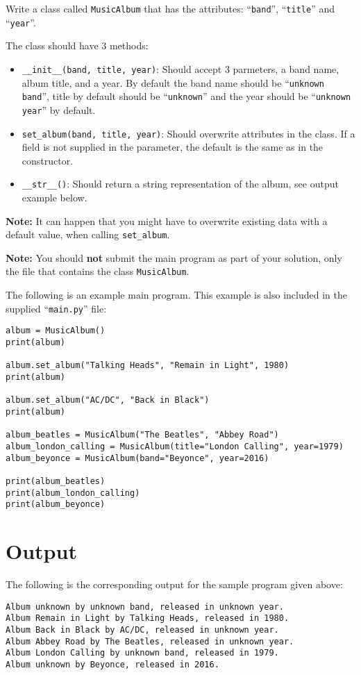
Write a class called \texttt{MusicAlbum} that has the attributes:
``\texttt{band}'', ``\texttt{title}'' and ``\texttt{year}''.

The class should have $3$ methods:
\begin{itemize}
    \item \texttt{\_\_init\_\_(band, title, year)}: 
    Should accept $3$ parmeters, a band name, album title, and a year.
    By default the band name should be ``\texttt{unknown band}'',
    title by default should be ``\texttt{unknown}''
    and the year should be ``\texttt{unknown year}'' by default.

    \item \texttt{set\_album(band, title, year)}:
    Should overwrite attributes in the class.
    If a field is not supplied in the parameter,
    the default is the same as in the constructor.

    \item \texttt{\_\_str\_\_()}:
    Should return a string representation of the album,
    see output example below.
\end{itemize}

\textbf{Note:}
It can happen that you might have to overwrite existing data with a default value,
when calling \texttt{set\_album}.

\textbf{Note:}
You should \textbf{not} submit the main program as part of your solution,
only the file that contains the class \texttt{MusicAlbum}.

The following is an example main program.
This example is also included in the supplied ``\texttt{main.py}'' file:
\begin{verbatim}
album = MusicAlbum()
print(album)

album.set_album("Talking Heads", "Remain in Light", 1980)
print(album)

album.set_album("AC/DC", "Back in Black")
print(album)

album_beatles = MusicAlbum("The Beatles", "Abbey Road")
album_london_calling = MusicAlbum(title="London Calling", year=1979)
album_beyonce = MusicAlbum(band="Beyonce", year=2016)

print(album_beatles)
print(album_london_calling)
print(album_beyonce)
\end{verbatim}


\section*{Output}

The following is the corresponding output for the sample program given above:

\begin{verbatim}
Album unknown by unknown band, released in unknown year.
Album Remain in Light by Talking Heads, released in 1980.
Album Back in Black by AC/DC, released in unknown year.
Album Abbey Road by The Beatles, released in unknown year.
Album London Calling by unknown band, released in 1979.
Album unknown by Beyonce, released in 2016.
\end{verbatim}
